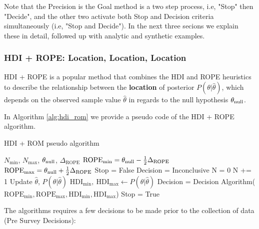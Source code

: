 Note that the Precision is the Goal method is a two step process, 
i.e, "Stop" then "Decide",
and the other two activate both Stop and Decision criteria simultaneously
(i.e, "Stop and Decide"). In the next three secions we explain these in detail,
followed up with analytic and synthetic examples.


\subsubsection{HDI + ROPE: Location, Location, Location}

HDI + ROPE is a popular method that combines the HDI and ROPE heuristics to describe
the relationship between the \textbf{location} of posterior $P(\theta|\hat\theta)$, which depends on the observed
sample value $\hat\theta$ in regards to the
null hypothesis $\theta_{\rm null}$.

In Algorithm \ref{alg:hdi_rom} we provide a pseudo code of the HDI + ROPE algorithm.



\begin{algorithm}
    \caption{HDI + ROM pseudo algorithm}\label{alg:hdi_rom}
    \begin{algorithmic}
    \Require $N_\mathrm{min}$, $N_\mathrm{max}$, $\theta_{\rm null}$, $\Delta_\mathrm{ROPE}$
    \State $\mathrm{ROPE}_\mathrm{min} = \theta_{\rm null} - \frac{1}{2}\Delta_\mathrm{ROPE}$
    \State $\mathrm{ROPE}_\mathrm{max} = \theta_{\rm null} + \frac{1}{2}\Delta_\mathrm{ROPE}$
    \State Stop = False
    \State Decision = Inconclusive
    \State N = 0
    \State N += 1  
    \State Update $\hat\theta$, $P(\theta|\hat\theta)$  
    \State $\mathrm{HDI}_\mathrm{min}, \ \mathrm{HDI}_\mathrm{max}  \gets P(\theta|\hat\theta)$
        \State Decision = Decision Algorithm($\mathrm{ROPE}_\mathrm{min}, \mathrm{ROPE}_\mathrm{max}, \mathrm{HDI}_\mathrm{min}, \mathrm{HDI}_\mathrm{max}$)
            \State \HiLi Stop = True  
        \EndIf
    \EndIf
    \EndWhile
    \end{algorithmic}
\end{algorithm}


The algorithms requires a few decisions to be made prior to the collection of data (Pre Survey Decisions):

